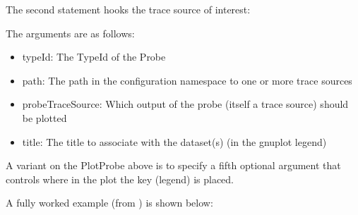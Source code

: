 \documentclass[letterpaper,10pt,english]{sphinxmanual}
\renewcommand{\sphinxcode}[1]{\texttt{\small{#1}}}
\begin{document}
The second statement hooks the trace source of interest:

\begin{sphinxVerbatim}[commandchars=\\\{\}]
    
                  
                  
                  
\end{sphinxVerbatim}

The arguments are as follows:
\begin{itemize}
\item {} 
typeId:  The  TypeId of the Probe

\item {} 
path:  The path in the  configuration namespace to one or more trace sources

\item {} 
probeTraceSource:  Which output of the probe (itself a trace source) should be plotted

\item {} 
title:  The title to associate with the dataset(s) (in the gnuplot legend)

\end{itemize}

A variant on the PlotProbe above is to specify a fifth optional argument
that controls where in the plot the key (legend) is placed.

A fully worked example (from \sphinxcode{}) is shown below:
\end{document}
